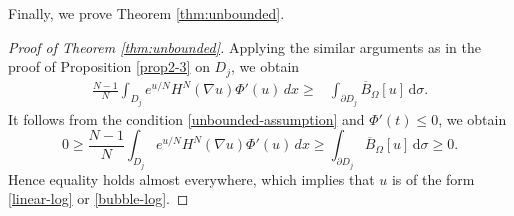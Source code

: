 \documentclass[10pt,a4paper]{amsart}
\numberwithin{equation}{section}
\newcommand{\pa}{\partial}
\begin{document}
Finally, we prove Theorem \ref{thm:unbounded}.

\begin{proof}[Proof of Theorem \ref{thm:unbounded}]
Applying the similar arguments as  in the proof of  Proposition \ref{prop2-3} on $D_j$, we obtain
\begin{align*}
    \frac{N-1}{N}\int_{D_j} e^{u/N}H^N(\nabla u)\Phi'(u)\,dx \ge & \int_{\pa D_j} \overline{B}_{\Omega}[u] \, \text{d} \sigma .
\end{align*}
It follows from the condition \eqref{unbounded-assumption} and $\Phi'(t) \leq 0$, we obtain
\[
    0 \ge \frac{N-1}{N}\int_{D_j} e^{u/N}H^N(\nabla u)\Phi'(u)\,dx  \geq \int_{\pa D_j} \overline{B}_{\Omega}[u] \, \text{d} \sigma \ge0.
\]
Hence equality holds almost everywhere, which implies that $u$ is of the form \eqref{linear-log} or \eqref{bubble-log}.
\end{proof}
\end{document}
